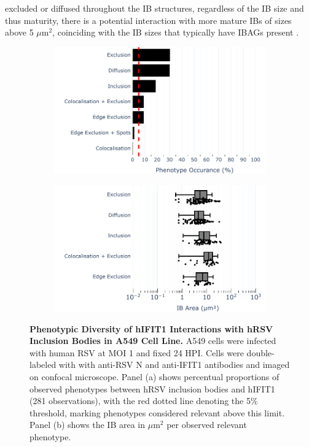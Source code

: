 excluded or diffused throughout the IB structures, regardless of the IB size and thus maturity, there is a potential interaction with more mature IBs of sizes above 5 \(\mu \mbox{m}^2\), coinciding with the IB sizes that typically have IBAGs present \cite{Rincheval2017FunctionalVirus}.

\begin{figure}
    \begin{subfigure}{0.495\textwidth}
        \caption{}
        \includegraphics[width=1\linewidth]{08. Chapter 3/Figs/02. Infection/01. IFIT1/01. bar_i1_a549.pdf} 
    \end{subfigure}
    \begin{subfigure}{0.495\textwidth}
        \caption{}
        \includegraphics[width=1\linewidth]{08. Chapter 3/Figs/02. Infection/01. IFIT1/02. box_i1_a549.pdf}
    \end{subfigure}
    \caption[Phenotypic Diversity of hIFIT1 Interactions with hRSV Inclusion Bodies in A549 Cell Line.]{\textbf{Phenotypic Diversity of hIFIT1 Interactions with hRSV Inclusion Bodies in A549 Cell Line.} A549 cells were infected with human RSV at MOI 1 and fixed 24 HPI. Cells were double-labeled with with anti-RSV N and anti-IFIT1 antibodies and imaged on confocal microscope. Panel (a) shows percentual proportions of observed phenotypes between hRSV inclusion bodies and hIFIT1 (281 observations), with the red dotted line denoting the 5\% threshold, marking phenotypes considered relevant above this limit. Panel (b) shows the IB area in \(\mu \mbox{m}^2\) per observed relevant phenotype.}
    \label{fig:Phenotypic Diversity of hIFIT1 Interactions with hRSV Inclusion Bodies in A549 Cell Line}
\end{figure}


